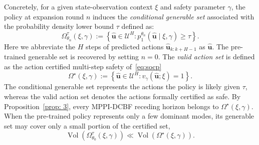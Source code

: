 \documentclass[letterpaper, 10 pt, conference]{ieeeconf}
\begin{document}
Concretely, for a given state-observation context \(\xi\) and safety parameter \(\gamma\), the policy at expansion round \(n\) induces the \textit{conditional generable set} associated with the probability density lower bound \(\tau\) defined as:
\begin{equation}
    \Omega_{\theta_n}^{\tau}(\xi,\gamma)
    :=
    \left\{
    \hat{\mathbf u}\in\mathcal U^H:
    p_1^{\theta_n}(\hat{\mathbf u}\mid\xi,\gamma)\ge\tau
    \right\}.
    \label{eq:conditional-generable-set}
\end{equation}
Here we abbreviate the \(H\) steps of predicted actions
\(\hat{\mathbf u}_{k:k+H-1}\) as \(\hat{\mathbf u}\). The pre-trained generable set is recovered by setting \(n=0\). The \textit{valid action set} is defined as the action certified multi-step safety of~\eqref{eq:socp}
\begin{equation}
    \Omega^\star(\xi,\gamma)
    :=
    \left\{
    \hat{\mathbf u}\in\mathcal U^H:
    v_\gamma(\hat{\mathbf u};\xi)=1
    \right\}.
    \label{eq:verifier-certified-set}
\end{equation}
The conditional generable set represents the actions the policy is likely given $\tau$, whereas the valid action set denotes the actions formally certified as safe. By Proposition~\ref{prop: 3}, every MPPI-DCBF receding horizon belongs to \(\Omega^\star(\xi,\gamma)\). When the pre-trained policy represents only a few dominant modes, its
generable set may cover only a small portion of the certified set,
\begin{equation}
    \operatorname{Vol}\!\left(
    \Omega_{\theta_0}^{\tau}(\xi,\gamma)
    \right)
    \ll
    \operatorname{Vol}\!\left(\Omega^\star(\xi,\gamma)\right).
\end{equation}


\end{document}
